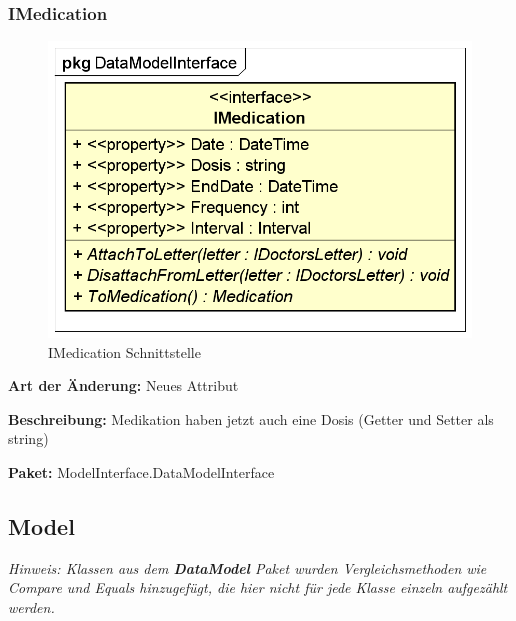 \documentclass[a4paper]{scrreprt}
\begin{document}
\subsubsection{IMedication}
\begin{figure}[H]
\centering
\includegraphics[width=0.75\textheight]{graphics/Klassendiagramme/Model/IMedication.png}
\caption{IMedication Schnittstelle}
\end{figure}
\textbf{Art der Änderung:} Neues Attribut

\textbf{Beschreibung:} Medikation haben jetzt auch eine Dosis (Getter und Setter als string)

\textbf{Paket:} ModelInterface.DataModelInterface

\subsection{Model}
\textit{Hinweis: Klassen aus dem \textbf{DataModel} Paket wurden Vergleichsmethoden wie Compare und Equals hinzugefügt, die hier nicht für jede Klasse einzeln aufgezählt werden.}
\end{document}

